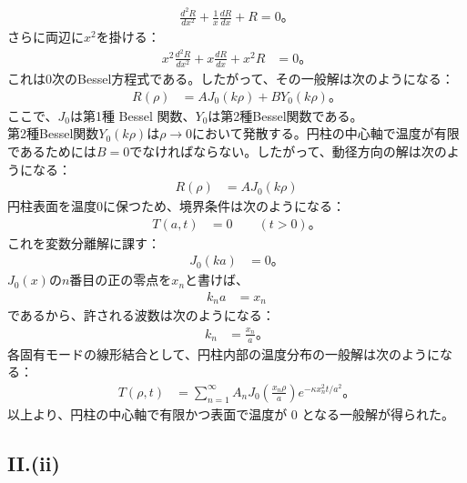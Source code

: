 \documentclass[platex,dvipdfmx,a4paper]{jsarticle}
\newcommand{\bbn}[2]{\frac{d #1}{d #2}}
\newcommand{\nbbn}[3]{\frac{d^{#1} #2}{d #3^{#1}}}
\begin{document}
  \begin{align*}
    \nbbn{2}{R}{x}+\frac{1}{x}\bbn{R}{x}+R=0。
  \end{align*}
  さらに両辺に$x^2$を掛ける：
  \begin{align*}
    x^2\nbbn{2}{R}{x}
    +x\bbn{R}{x}
    +x^2R&=0。
  \end{align*}
  これは$0$次のBessel方程式である。したがって、その一般解は次のようになる：
  \begin{align*}
    R(\rho)
    &=A J_0(k\rho)+B Y_0(k\rho)。
  \end{align*}
  ここで、$J_0$は第1種 Bessel 関数、$Y_0$は第2種Bessel関数である。\\
  第2種Bessel関数$Y_0(k\rho)$は$\rho\to0$において発散する。円柱の中心軸で温度が有限であるためには$B=0$でなければならない。したがって、動径方向の解は次のようになる：
  \begin{align*}
    R(\rho)&=A J_0(k\rho)
  \end{align*}
  円柱表面を温度$0$に保つため、境界条件は次のようになる：
  \begin{align*}
    T(a,t)&=0\qquad (t>0)。
  \end{align*}
  これを変数分離解に課す：
  \begin{align*}
    J_0(ka)&=0。
  \end{align*}
  $J_0(x)$の$n$番目の正の零点を$x_n$と書けば、
  \begin{align*}
    k_na&=x_n
  \end{align*}
  であるから、許される波数は次のようになる：
  \begin{align*}
    k_n&=\frac{x_n}{a}。
  \end{align*}
  各固有モードの線形結合として、円柱内部の温度分布の一般解は次のようになる：
  \begin{align*}
    T(\rho,t)
    &=\sum_{n=1}^{\infty}
      A_nJ_0\left(\frac{x_n\rho}{a}\right)
      e^{-\kappa x_n^2t/a^2}。
  \end{align*}
  以上より、円柱の中心軸で有限かつ表面で温度が $0$ となる一般解が得られた。
  
  \subsection*{II.(ii)}
  
\end{document}
